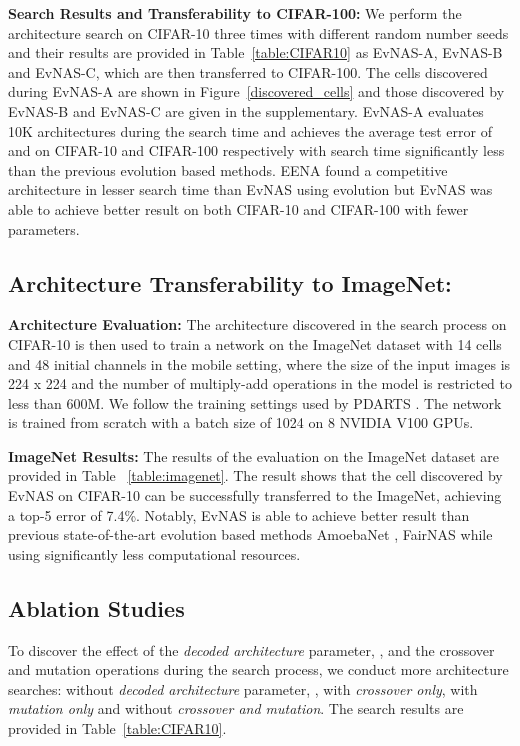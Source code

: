 \documentclass[final]{cvpr}
\begin{document}
\textbf{Search Results and Transferability to CIFAR-100:} We perform the architecture search on
CIFAR-10 three times with different random number seeds and their
results are provided in Table~\ref{table:CIFAR10} as EvNAS-A, EvNAS-B and EvNAS-C, which are then
transferred to CIFAR-100. The cells discovered during EvNAS-A are shown in
Figure~\ref{discovered_cells} and those discovered by EvNAS-B and EvNAS-C are given in the
supplementary. EvNAS-A evaluates 10K architectures during the search time and achieves the
average test error of  and  on CIFAR-10 and CIFAR-100 respectively with
search time significantly less than the previous evolution based methods.
EENA \cite{zhu2019eena} found a competitive architecture in lesser search time than EvNAS using
evolution but EvNAS was able to achieve better result on both CIFAR-10 and CIFAR-100 with fewer
parameters. 

\subsection{Architecture Transferability to ImageNet:}
\textbf{Architecture Evaluation:} The architecture discovered in the search process on CIFAR-10 is
then used to train a network on the ImageNet dataset \cite{imagenet_cvpr09} with 14 cells and 48
initial channels in the mobile setting, where the size of the input images is 224 x 224 and the
number of multiply-add operations in the model is restricted to less than 600M. We follow the
training settings used by PDARTS \cite{chen2019progressive}. The network is trained from scratch with a batch size of 1024 on 8 NVIDIA V100 GPUs. 


\textbf{ImageNet Results:}  The results of the evaluation on the ImageNet dataset are provided in
Table ~\ref{table:imagenet}. The result shows that the cell discovered by EvNAS on CIFAR-10 can be
successfully transferred to the ImageNet, achieving a top-5 error of 7.4\%. Notably, EvNAS is able
to achieve better result than previous state-of-the-art evolution based methods AmoebaNet
\cite{real2019regularized}, FairNAS \cite{chu2019fairnas} while using significantly less computational resources.

\subsection{Ablation Studies} \label{ablation}
To discover the effect of the \textit{decoded architecture} parameter, , and the
crossover and mutation operations during the search process, we conduct more architecture
searches: without \textit{decoded architecture} parameter, , with \textit{crossover 
only}, with \textit{mutation only} and without \textit{crossover and mutation}. The search results
are provided in Table~\ref{table:CIFAR10}.
\end{document}
